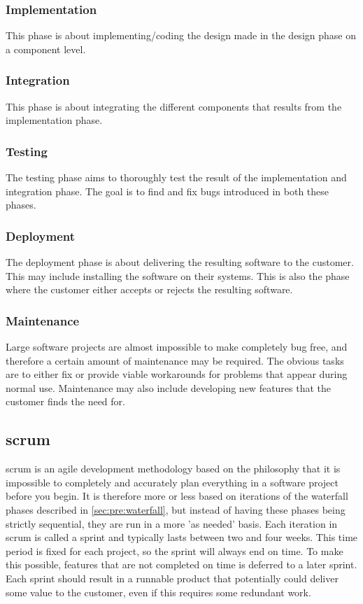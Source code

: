 \subsubsection{Implementation}
This phase is about implementing/coding the design made in the design phase on
a component level.

\subsubsection{Integration}
This phase is about integrating the different components that results from the
implementation phase.

\subsubsection{Testing}
The testing phase aims to thoroughly test the result of the implementation and
integration phase. The goal is to find and fix bugs introduced in both these
phases.

\subsubsection{Deployment}
The deployment phase is about delivering the resulting software to the
customer. This may include installing the software on their systems. This is
also the phase where the customer either accepts or rejects the resulting
software.

\subsubsection{Maintenance}
Large software projects are almost impossible to make completely bug free, and
therefore a certain amount of maintenance may be required. The obvious tasks
are to either fix or provide viable workarounds for problems that appear during
normal use. Maintenance may also include developing new features that the
customer finds the need for.

\subsection{\Gls{scrum}}
\label{sec:pre:scrum}
\Gls{scrum} is an agile development methodology based on the philosophy that it is
impossible to completely and accurately plan everything in a software project
before you begin. It is therefore more or less based on iterations of the
waterfall phases described in \autoref{sec:pre:waterfall}, but instead of
having these phases being strictly sequential, they are run in a more
'as needed' basis. Each iteration in \Gls{scrum} is called a sprint and typically
lasts between two and four weeks. This time period is fixed for each
project, so the sprint will always end on time. To make this possible, features
that are not completed on time is deferred to a later sprint. Each sprint
should result in a runnable product that potentially could deliver some value
to the customer, even if this requires some redundant work.

